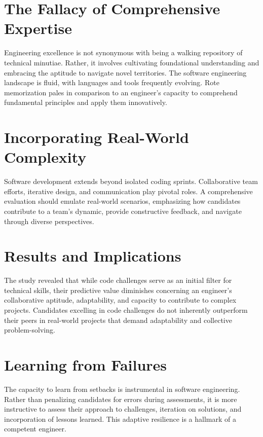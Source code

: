 \documentclass[
    a4paper, %
    10pt, %
    unnumberedsections, %
    twoside, %
]{LTJournalArticle}
\begin{document}

\section{The Fallacy of Comprehensive Expertise}

Engineering excellence is not synonymous with being a walking repository of technical minutiae. Rather, it involves cultivating foundational understanding and embracing the aptitude to navigate novel territories. The software engineering landscape is fluid, with languages and tools frequently evolving. Rote memorization pales in comparison to an engineer's capacity to comprehend fundamental principles and apply them innovatively.

\section{Incorporating Real-World Complexity}

Software development extends beyond isolated coding sprints. Collaborative team efforts, iterative design, and communication play pivotal roles. A comprehensive evaluation should emulate real-world scenarios, emphasizing how candidates contribute to a team's dynamic, provide constructive feedback, and navigate through diverse perspectives.


\section{Results and Implications}

The study revealed that while code challenges serve as an initial filter for technical skills, their predictive value diminishes concerning an engineer's collaborative aptitude, adaptability, and capacity to contribute to complex projects. Candidates excelling in code challenges do not inherently outperform their peers in real-world projects that demand adaptability and collective problem-solving.

\section{Learning from Failures}

The capacity to learn from setbacks is instrumental in software engineering. Rather than penalizing candidates for errors during assessments, it is more instructive to assess their approach to challenges, iteration on solutions, and incorporation of lessons learned. This adaptive resilience is a hallmark of a competent engineer.
\end{document}
